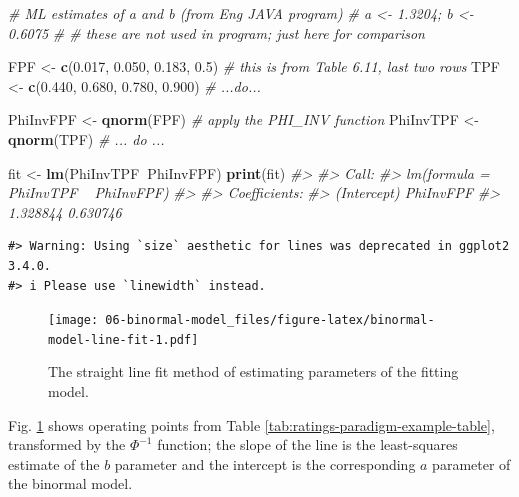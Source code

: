 \documentclass[
]{book}
\newenvironment{Shaded}{\begin{snugshade}}{\end{snugshade}}
\newcommand{\CommentTok}[1]{\textcolor[rgb]{0.56,0.35,0.01}{\textit{#1}}}
\newcommand{\FloatTok}[1]{\textcolor[rgb]{0.00,0.00,0.81}{#1}}
\newcommand{\KeywordTok}[1]{\textcolor[rgb]{0.13,0.29,0.53}{\textbf{#1}}}
\newcommand{\NormalTok}[1]{#1}
\newcommand{\OperatorTok}[1]{\textcolor[rgb]{0.81,0.36,0.00}{\textbf{#1}}}
\newcommand{\StringTok}[1]{\textcolor[rgb]{0.31,0.60,0.02}{#1}}
\begin{document}
\begin{Shaded}
\begin{Highlighting}[]
\CommentTok{# ML estimates of a and b (from Eng JAVA program)}
\CommentTok{# a <- 1.3204; b <- 0.6075 }
\CommentTok{# # these are not used in program; just here for comparison}

\NormalTok{FPF <-}\StringTok{ }\KeywordTok{c}\NormalTok{(}\FloatTok{0.017}\NormalTok{, }\FloatTok{0.050}\NormalTok{, }\FloatTok{0.183}\NormalTok{, }\FloatTok{0.5}\NormalTok{)  }
\CommentTok{# this is from Table 6.11, last two rows}
\NormalTok{TPF <-}\StringTok{ }\KeywordTok{c}\NormalTok{(}\FloatTok{0.440}\NormalTok{, }\FloatTok{0.680}\NormalTok{, }\FloatTok{0.780}\NormalTok{, }\FloatTok{0.900}\NormalTok{)}
\CommentTok{# ...do...}

\NormalTok{PhiInvFPF <-}\StringTok{ }\KeywordTok{qnorm}\NormalTok{(FPF)}
\CommentTok{# apply the PHI_INV function}
\NormalTok{PhiInvTPF <-}\StringTok{ }\KeywordTok{qnorm}\NormalTok{(TPF)}
\CommentTok{# ... do ... }

\NormalTok{fit <-}\StringTok{ }\KeywordTok{lm}\NormalTok{(PhiInvTPF}\OperatorTok{~}\NormalTok{PhiInvFPF)}
\KeywordTok{print}\NormalTok{(fit)}
\CommentTok{#> }
\CommentTok{#> Call:}
\CommentTok{#> lm(formula = PhiInvTPF ~ PhiInvFPF)}
\CommentTok{#> }
\CommentTok{#> Coefficients:}
\CommentTok{#> (Intercept)    PhiInvFPF  }
\CommentTok{#>    1.328844     0.630746}
\end{Highlighting}
\end{Shaded}

\begin{verbatim}
#> Warning: Using `size` aesthetic for lines was deprecated in ggplot2 3.4.0.
#> i Please use `linewidth` instead.
\end{verbatim}

\begin{figure}
\centering
\texttt{[image: 06-binormal-model\_files/figure-latex/binormal-model-line-fit-1.pdf]}
\caption{\label{fig:binormal-model-line-fit}The straight line fit method of estimating parameters of the fitting model.}
\end{figure}

Fig. \ref{fig:binormal-model-line-fit} shows operating points from Table \ref{tab:ratings-paradigm-example-table}, transformed by the \(\Phi^{-1}\) function; the slope of the line is the least-squares estimate of the \(b\) parameter and the intercept is the corresponding \(a\) parameter of the binormal model.
\end{document}
